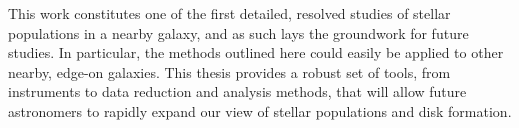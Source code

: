 This work constitutes one of the first detailed, resolved studies of
stellar populations in a nearby galaxy, and as such lays the groundwork
for future studies. In particular, the methods outlined here could
easily be applied to other nearby, edge-on galaxies. This thesis
provides a robust set of tools, from instruments to data reduction and
analysis methods, that will allow future astronomers to rapidly expand
our view of stellar populations and disk formation.



\clearpage
{} %
